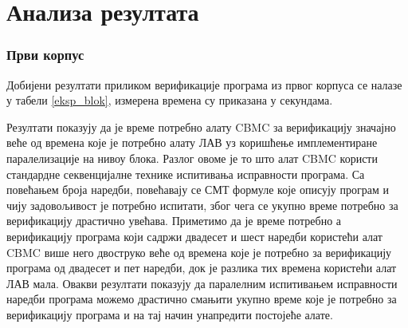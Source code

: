 \documentclass[12pt,oneside]{memoir}
\begin{document}
 
  
 \section{Анализа резултата}
	
 \subsubsection{Први корпус} 
  Добијени резултати приликом верификације програма из првог корпуса се налазе у табели \ref{eksp_blok}, измерена времена су приказана у секундама. 
  
  Резултати показују да је време потребно алату CBMC за верификацију значајно веће од времена које је потребно алату ЛАВ уз коришћење имплементиране паралелизације на нивоу блока. Разлог овоме је то што алат CBMC користи стандардне секвенцијалне технике испитивања исправности програма. Са повећањем броја наредби, повећавају се СМТ формуле које описују програм и чију задовољивост је потребно испитати, због чега се укупно време потребно за верификацију драстично увећава. Приметимо да је време потребно а верификацију програма који садржи двадесет и шест наредби користећи алат CBMC више него двоструко веће од времена које је потребно за верификацију програма од двадесет и пет наредби, док је разлика тих времена користећи алат ЛАВ мала. Овакви резултати показују да паралелним испитивањем исправности наредби програма можемо драстично смањити укупно време које је потребно за верификацију програма и на тај начин унапредити постојеће алате.
  
\end{document}

